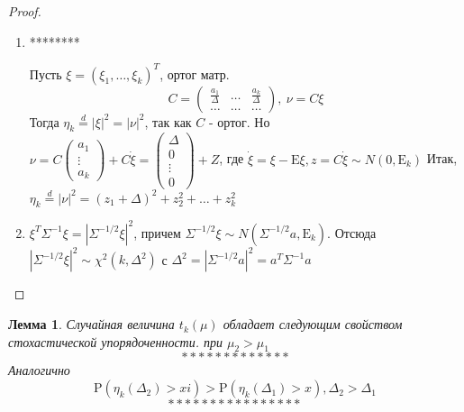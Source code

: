 \documentclass[12pt]{article}
\newtheorem{lemma}{Лемма}
\theoremstyle{basic_theorem}
\theoremstyle{name_theorem}
\def\E{
    \mathrm{E}
}
\def\P{
    \mathrm{P}
}
\begin{document}
\begin{proof}
    \begin{enumerate}
        \item ********
        
        Пусть $\xi=(\xi_1,\ldots, \xi_k)^T$, ортог матр.
        $$C=\begin{pmatrix}
            \frac{a_1}{\Delta}& \ldots& \frac{a_k}{\Delta} \\
            \ldots & \ldots &\ldots
        \end{pmatrix},\ \nu=C\xi$$
        Тогда $\eta_k\overset{d}{=}\left\lvert \xi \right\rvert ^2=\left\lvert \nu \right\rvert ^2$, так как $C$ - ортог.
        Но $\nu=C\begin{pmatrix}
            a_1 \\
            \vdots \\
            a_k
        \end{pmatrix} + C\dot{\xi}=\begin{pmatrix}
            \Delta \\
            0 \\
            \vdots \\
            0
        \end{pmatrix} + Z$, где $\dot{\xi}=\xi-\E\xi, z=C\dot{\xi}\sim N(0, \E_k)$
        Итак, $\eta_k\overset{d}{=}\left\lvert \nu \right\rvert ^2=(z_1+\Delta)^2+z_2^2+\ldots+z_k^2$
        \item $\xi^T\Sigma^{-1}\xi=\left\lvert \Sigma^{-1/2}\xi \right\rvert ^2$, причем $\Sigma^{-1/2}\xi\sim N(\Sigma^{-1/2}a, \E_k)$.
        Отсюда $\left\lvert \Sigma^{-1/2}\xi \right\rvert ^2\sim\chi^2(k,\Delta^2)$ с $\Delta^2=\left\lvert \Sigma^{-1/2}a \right\rvert ^2=a^T\Sigma^{-1}a$
    \end{enumerate}
\end{proof}
    \begin{lemma}
        Случайная величина $t_k(\mu)$ обладает следующим свойством стохастической упорядоченности.
        при $\mu_2>\mu_1$
        \begin{equation}
            *************
        \end{equation}
        Аналогично 
        \begin{equation}
            \P(\eta_k(\Delta_2)>xi) > \P(\eta_k(\Delta_1)>x), \Delta_2 > \Delta_1
        \end{equation}
        \begin{equation}
            ****************
        \end{equation}
    \end{lemma}
\end{document}
